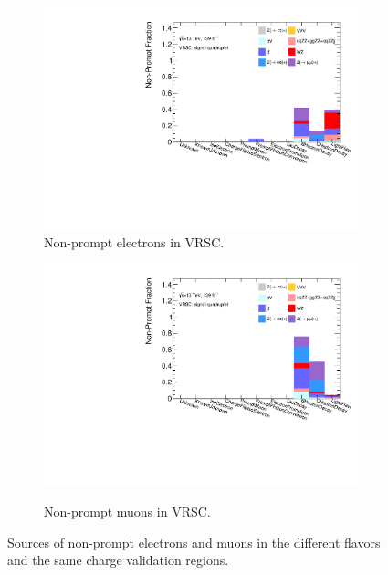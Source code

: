 \begin{figure}[!htb]
\begin{subfigure}{.48\textwidth}
        \includegraphics[width=.9\linewidth]{figures/Analysis/Background/NonPromptCRSCSignal_Electrons_.pdf}
    \caption{Non-prompt electrons in VRSC.\label{fig:VRSC_Elec_NonPromptComp}}
    \end{subfigure}
    \begin{subfigure}{.48\textwidth}
        \centering
        {\includegraphics[width=.9\linewidth]{figures/Analysis/Background/NonPromptCRSCSignal_Muons_.pdf}}\\
        \caption{Non-prompt muons in VRSC.\label{fig:VRSC_Muon_NonPromptComp}}
    \end{subfigure}
    \caption{ Sources of non-prompt electrons and muons in the different flavors and the same charge validation regions. \label{fig:VRNonPromptComposition}}
\end{figure}

